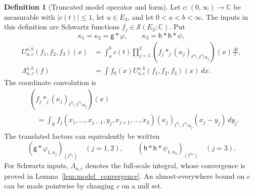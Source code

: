 \documentclass[12pt,reqno]{amsart}
\theoremstyle{plain}
\theoremstyle{definition}
\newtheorem{definition}[theorem]{Definition}
\theoremstyle{remark}
\numberwithin{equation}{section}
\newcommand{\R}{\mathbb R}
\newcommand{\C}{\mathbb C}
\newcommand{\Sp}{\mathcal S}
\newcommand{\g}{\mathsf g}
\newcommand{\h}{\mathsf h}
\newcommand{\dd}{\,d}
\begin{document}
\begin{definition}[Truncated model operator and form]\label{def:model}
Let $c:(0,\infty)\to\C$ be measurable with $|c(t)|\le1$, let
$u\in E_3$, and let $0<a<b<\infty$. The inputs in this definition
are Schwartz functions $f_j\in\Sp(E_3;\C)$. Put
\[
 \kappa_1=\kappa_2=\g*\varphi,\qquad\kappa_3=\h*\h*\psi,
\]
\begin{align*}
 U^{a,b}_{u,c}(f_1,f_2,f_3)(x)&=\int_a^bc(t)
    \prod_{j=1}^3(f_j*_j(\kappa_j)_{t^{\alpha_j},t^{\alpha_j}u_j})(x)
                  \frac{\dd t}{t},\\
 \Lambda^{a,b}_{u,c}(f)&=\int f_0(x)U^{a,b}_{u,c}(f_1,f_2,f_3)(x)\dd x.
\end{align*}
The coordinate convolution is
\begin{align*}
 &(f_j*_j(\kappa_j)_{t^{\alpha_j},t^{\alpha_j}u_j})(x)\\
 &\quad=\int_\R f_j(x_1,\ldots,x_{j-1},y_j,x_{j+1},\ldots,x_3)
    (\kappa_j)_{t^{\alpha_j},t^{\alpha_j}u_j}(x_j-y_j)\dd y_j.
\end{align*}
The translated factors can equivalently be written
\[
 (\g*\varphi_{1,u_j})_{(t^{\alpha_j})}\quad(j=1,2),
 \qquad (\h*\h*\psi_{1,u_3})_{(t^{\alpha_3})}\quad(j=3).
\]
For Schwartz inputs, $\Lambda_{u,c}$ denotes the full-scale integral,
whose convergence is proved in Lemma~\ref{lem:model_convergence}.
An almost-everywhere bound on $c$ can be made pointwise by changing
$c$ on a null set.
\end{definition}
\end{document}
